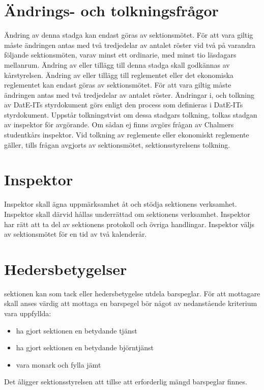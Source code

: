 \documentclass[a4paper]{dtek}
\begin{document}
\section{Ändrings- och tolkningsfrågor}
\para[Stadgeändringar] Ändring av denna stadga kan endast göras av sektionsmötet. För att vara giltig måste ändringen antas med två tredjedelar av antalet röster vid två på varandra följande sektionsmöten, varav minst ett ordinarie, med minst tio läsdagars mellanrum.
\stycke Ändring av eller tillägg till denna stadga skall godkännas av kårstyrelsen.
\para[Reglementesändring] Ändring av eller tillägg till reglementet eller det ekonomiska reglementet kan endast göras av sektionsmötet. För att vara giltig måste ändringen antas med två tredjedelar av antalet röster.
 Ändringar i, och tolkning av DatE-ITs styrdokument görs enligt den process som definieras i DatE-ITs styrdokument.
\para[Tolkningstvist] Uppstår tolkningstvist om dessa stadgars tolkning, tolkas stadgan av inspektor för avgörande. Om sådan ej finns avgörs frågan av Chalmers studentkårs inspektor.
\stycke Vid tolkning av reglemente eller ekonomiskt reglemente gäller, tills frågan avgjorts av sektionsmötet, sektionsstyrelsens tolkning.

\section{Inspektor}
\para[Allmänt] Inspektor skall ägna uppmärksamhet åt och stödja sektionens verksamhet. Inspektor skall därvid hållas underrättad om sektionens verksamhet. Inspektor har rätt att ta del av sektionens protokoll och övriga handlingar.
\para[Val] Inspektor väljs av sektionsmötet för en tid av två kalenderår.

\section{Hedersbetygelser}
\para[Allmänt] sektionen kan som tack eller hedersbetygelse utdela barspeglar.
\para[Kriterier] För att mottagare skall anses värdig att mottaga en barspegel bör något av nedanstående kriterium vara uppfyllda:
\begin{itemize}
\item ha gjort sektionen en betydande tjänst
\item ha gjort sektionen en betydande björntjänst
\item vara monark och fylla jämt
\end{itemize}
\para[Införskaffande] Det åligger sektionsstyrelsen att tillse att erforderlig mängd barspeglar finnes.
\end{document}
